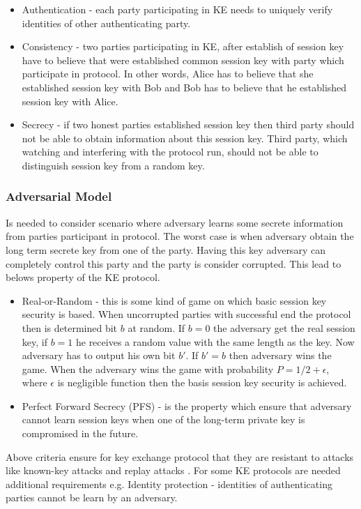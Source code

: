 \documentclass[11pt,titlepage]{article}
\theoremstyle{plain}
\begin{document}
\begin{itemize}
\item Authentication - each party participating in KE needs to uniquely verify identities of other authenticating party.
\item Consistency - two parties participating in KE, after establish of session key have to believe that were established common session key with party which participate in protocol. In other words, Alice has to believe that she established session key with Bob and Bob has to believe that he established session key with Alice.
\item Secrecy - if two honest parties established session key then third party should not be able to obtain information about this session key. Third party, which watching and interfering with the protocol run, should not be able to distinguish session key from a random key.
\end{itemize}

\subsubsection{Adversarial Model}
Is needed to consider scenario where adversary learns some secrete information from parties participant in protocol. The worst case is when adversary obtain the long term secrete key from one of the party. Having this key adversary can completely control this party and the party is consider corrupted. This lead to belows property of the KE protocol.

\begin{itemize}
\item Real-or-Random - this is some kind of game on which basic session key security is based. When uncorrupted parties with successful end the protocol then is determined bit $b$ at random. If $b=0$ the adversary get the real session key, if $b = 1$ he receives a random value with the same length as the key. Now adversary has to output his own bit $b'$. If $b' = b$ then adversary wins the game. When the adversary wins the game with probability $P = 1/2+\epsilon$, where $\epsilon$ is negligible function then the basis session key security is achieved.
\item Perfect Forward Secrecy (PFS) - is the property which ensure that adversary cannot learn session keys when one of the long-term private key is compromised in the future.
\end{itemize}

Above criteria ensure for key exchange protocol that they are resistant to attacks like known-key attacks and replay attacks \cite{cryptography}. For some KE protocols are needed additional requirements e.g. Identity protection - identities of authenticating parties cannot be learn by an adversary.
\end{document}

